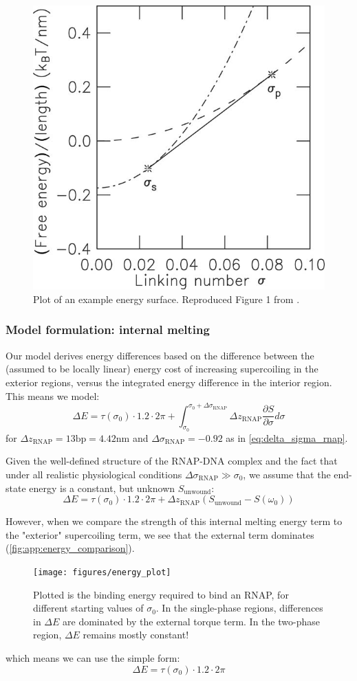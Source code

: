 \documentclass[11pt]{article}
\begin{document}
\begin{figure}[h]
    \centering
    \includegraphics[width=.5\linewidth]{figures/marko_linking_number_graph}
    \caption{Plot of an example energy surface. Reproduced Figure 1 from \textcite{markoTorqueDynamicsLinking2007}.}
    \label{fig:marko_energy_surface}
\end{figure}
\subsubsection{Model formulation: internal melting}
Our model derives energy differences based on the difference between the (assumed to be locally linear) energy cost of increasing supercoiling in the exterior regions,
versus the integrated energy difference in the interior region. This means we model:
\[\Delta E = \tau(\sigma_0) \cdot 1.2 \cdot 2\pi + \int_{\sigma_0}^{\sigma_0 + \Delta \sigma_\text{RNAP}} \Delta z_\text{RNAP} \frac{\partial S}{\partial \sigma} d\sigma\]
for \(\Delta z_\text{RNAP} = 13 \text{bp} = 4.42 \text{nm}\) and \(\Delta \sigma_\text{RNAP} = -0.92\) as in \autoref{eq:delta_sigma_rnap}.

Given the well-defined structure of the RNAP-DNA complex and the fact that under all realistic physiological conditions \(\Delta \sigma_\text{RNAP} \gg \sigma_0\), we assume that the end-state energy is a constant, but unknown \(S_\text{unwound}\):
\begin{equation}
    \Delta E = \tau(\sigma_0) \cdot 1.2 \cdot 2\pi + \Delta z_\text{RNAP} \left(S_\text{unwound} - S(\omega_0)\right)
\end{equation}


However, when we compare the strength of this internal melting energy term to the "exterior" supercoiling term, we see that the external term dominates (\autoref{fig:app:energy_comparison}).
\begin{figure}[h]
    \centering
    \texttt{[image: figures/energy\_plot]}
    \caption{Plotted is the binding energy required to bind an RNAP, for different starting values of \(\sigma_0\). In the single-phase regions, differences in \(\Delta E\) are dominated by the external torque term. In the two-phase region, \(\Delta E\) remains mostly constant!}
    \label{fig:app:energy_comparison}
\end{figure}
which means we can use the simple form:
\begin{equation}
    \Delta E = \tau(\sigma_0) \cdot 1.2 \cdot 2\pi
\end{equation}
\end{document}
